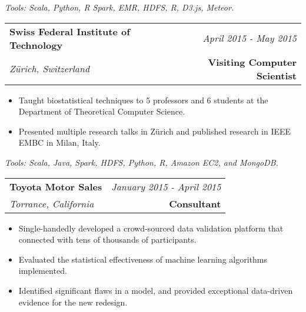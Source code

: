 \documentclass[10pt,a4paper]{article}
\begin{document}
  \vspace*{2mm}\setlength\parindent{2mm}\begin{minipage}{16.8cm}
    \textit{Tools: Scala, Python, R Spark, EMR, HDFS, R, D3.js, Meteor.}
  \end{minipage}


  \vspace*{3mm}\noindent\begin{tabularx}{17cm}{X r}
    \textbf{Swiss Federal Institute of Technology} & \textit{April 2015 - May 2015} \\
    \textit{Z{\"u}rich, Switzerland} & \textbf{Visiting Computer Scientist} \\
  \end{tabularx}

  \vspace*{1mm}\noindent\begin{minipage}{17cm}
    \begin{itemize}[leftmargin=6mm,topsep=0mm,itemsep=-1mm]
      \item Taught biostatistical techniques to 5 professors and 6 students at the Department of Theoretical Computer Science. 
      \item Presented multiple research talks in Z{\"u}rich and published research in IEEE EMBC in Milan, Italy.
    \end{itemize}
  \end{minipage}

  \vspace*{2mm}\setlength\parindent{2mm}\begin{minipage}{16.8cm}
    \textit{Tools: Scala, Java, Spark, HDFS, Python, R, Amazon EC2, and MongoDB.}
  \end{minipage}

  \vspace*{3mm}\noindent\begin{tabularx}{17cm}{X r}
    \textbf{Toyota Motor Sales} & \textit{January 2015 - April 2015} \\
    \textit{Torrance, California} & \textbf{Consultant} \\
  \end{tabularx}

  \vspace*{1mm}\noindent\begin{minipage}{17cm}
    \begin{itemize}[leftmargin=6mm,topsep=0mm,itemsep=-1mm]
      \item Single-handedly developed a crowd-sourced data validation platform that connected with tens of thousands of participants. 
      \item Evaluated the statistical effectiveness of machine learning algorithms implemented.
      \item Identified significant flaws in a model, and provided exceptional data-driven evidence for the new redesign.
    \end{itemize}
  \end{minipage}
\end{document}
